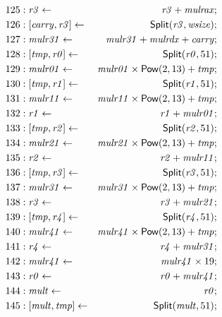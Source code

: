 {\begin{multicols}{2}
\begin{align*}
125 &: \mathit{r3} \leftarrow & \mathit{r3} + \mathit{mulrax}; \\
126 &: \concat{\mathit{carry}}{\mathit{r3}} \leftarrow & \dslcode{Split}(\mathit{r3}, \mathit{wsize}); \\
127 &: \mathit{mulr31} \leftarrow & \mathit{mulr31} + \mathit{mulrdx} + \mathit{carry}; \\
128 &: \concat{\mathit{tmp}}{\mathit{r0}} \leftarrow & \dslcode{Split}(\mathit{r0}, 51); \\
129 &: \mathit{mulr01} \leftarrow & \mathit{mulr01} \times \dslcode{Pow}(2, 13) + \mathit{tmp}; \\
130 &: \concat{\mathit{tmp}}{\mathit{r1}} \leftarrow & \dslcode{Split}(\mathit{r1}, 51); \\
131 &: \mathit{mulr11} \leftarrow & \mathit{mulr11} \times \dslcode{Pow}(2, 13) + \mathit{tmp}; \\
132 &: \mathit{r1} \leftarrow & \mathit{r1} + \mathit{mulr01}; \\
133 &: \concat{\mathit{tmp}}{\mathit{r2}} \leftarrow & \dslcode{Split}(\mathit{r2}, 51); \\
134 &: \mathit{mulr21} \leftarrow & \mathit{mulr21} \times \dslcode{Pow}(2, 13) + \mathit{tmp}; \\
135 &: \mathit{r2} \leftarrow & \mathit{r2} + \mathit{mulr11}; \\
136 &: \concat{\mathit{tmp}}{\mathit{r3}} \leftarrow & \dslcode{Split}(\mathit{r3}, 51); \\
137 &: \mathit{mulr31} \leftarrow & \mathit{mulr31} \times \dslcode{Pow}(2, 13) + \mathit{tmp}; \\
138 &: \mathit{r3} \leftarrow & \mathit{r3} + \mathit{mulr21}; \\
139 &: \concat{\mathit{tmp}}{\mathit{r4}} \leftarrow & \dslcode{Split}(\mathit{r4}, 51); \\
140 &: \mathit{mulr41} \leftarrow & \mathit{mulr41} \times \dslcode{Pow}(2, 13) + \mathit{tmp}; \\
141 &: \mathit{r4} \leftarrow & \mathit{r4} + \mathit{mulr31}; \\
142 &: \mathit{mulr41} \leftarrow & \mathit{mulr41} \times 19; \\
143 &: \mathit{r0} \leftarrow & \mathit{r0} + \mathit{mulr41}; \\
144 &: \mathit{mult} \leftarrow & \mathit{r0}; \\
145 &: \concat{\mathit{mult}}{\mathit{tmp}} \leftarrow & \dslcode{Split}(\mathit{mult}, 51); \\

\end{align*}
\end{multicols}}
